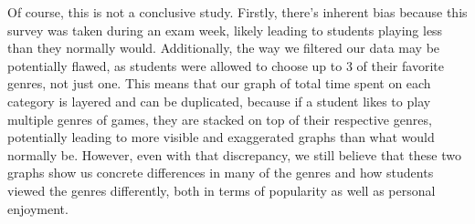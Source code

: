 \documentclass[
]{article}
\begin{document}
Of course, this is not a conclusive study. Firstly, there's inherent
bias because this survey was taken during an exam week, likely leading
to students playing less than they normally would. Additionally, the way
we filtered our data may be potentially flawed, as students were allowed
to choose up to 3 of their favorite genres, not just one. This means
that our graph of total time spent on each category is layered and can
be duplicated, because if a student likes to play multiple genres of
games, they are stacked on top of their respective genres, potentially
leading to more visible and exaggerated graphs than what would normally
be. However, even with that discrepancy, we still believe that these two
graphs show us concrete differences in many of the genres and how
students viewed the genres differently, both in terms of popularity as
well as personal enjoyment.
\end{document}

